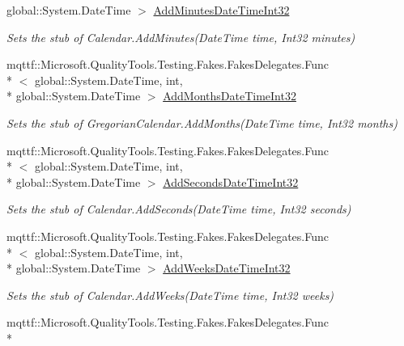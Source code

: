\begin{DoxyCompactItemize}
global\-::\-System.\-Date\-Time $>$ \hyperlink{class_system_1_1_globalization_1_1_fakes_1_1_stub_gregorian_calendar_ac3cde36364fe8c9779093e3f42ef032f}{Add\-Minutes\-Date\-Time\-Int32}
\begin{DoxyCompactList}\small\item\em Sets the stub of Calendar.\-Add\-Minutes(\-Date\-Time time, Int32 minutes)\end{DoxyCompactList}\item 
mqttf\-::\-Microsoft.\-Quality\-Tools.\-Testing.\-Fakes.\-Fakes\-Delegates.\-Func\\*
$<$ global\-::\-System.\-Date\-Time, int, \\*
global\-::\-System.\-Date\-Time $>$ \hyperlink{class_system_1_1_globalization_1_1_fakes_1_1_stub_gregorian_calendar_a057ab65ffac017bad962996eb887a49e}{Add\-Months\-Date\-Time\-Int32}
\begin{DoxyCompactList}\small\item\em Sets the stub of Gregorian\-Calendar.\-Add\-Months(\-Date\-Time time, Int32 months)\end{DoxyCompactList}\item 
mqttf\-::\-Microsoft.\-Quality\-Tools.\-Testing.\-Fakes.\-Fakes\-Delegates.\-Func\\*
$<$ global\-::\-System.\-Date\-Time, int, \\*
global\-::\-System.\-Date\-Time $>$ \hyperlink{class_system_1_1_globalization_1_1_fakes_1_1_stub_gregorian_calendar_a3f3882fcf81ca21106a400617cc7d853}{Add\-Seconds\-Date\-Time\-Int32}
\begin{DoxyCompactList}\small\item\em Sets the stub of Calendar.\-Add\-Seconds(\-Date\-Time time, Int32 seconds)\end{DoxyCompactList}\item 
mqttf\-::\-Microsoft.\-Quality\-Tools.\-Testing.\-Fakes.\-Fakes\-Delegates.\-Func\\*
$<$ global\-::\-System.\-Date\-Time, int, \\*
global\-::\-System.\-Date\-Time $>$ \hyperlink{class_system_1_1_globalization_1_1_fakes_1_1_stub_gregorian_calendar_ac5734a8a2073e2d9e9a0571bebe6fe39}{Add\-Weeks\-Date\-Time\-Int32}
\begin{DoxyCompactList}\small\item\em Sets the stub of Calendar.\-Add\-Weeks(\-Date\-Time time, Int32 weeks)\end{DoxyCompactList}\item 
mqttf\-::\-Microsoft.\-Quality\-Tools.\-Testing.\-Fakes.\-Fakes\-Delegates.\-Func\\*

\end{DoxyCompactItemize}
